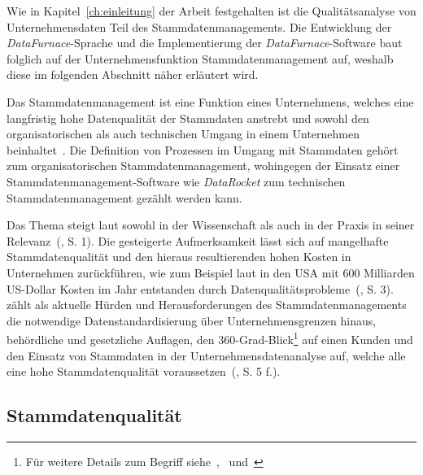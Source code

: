 \documentclass[
  language=german, %
  type=bachelor,%
  ngerman
]{isthesis}
\begin{document}
\begin{content}
  Wie in Kapitel~\ref{ch:einleitung} der Arbeit festgehalten ist die
  Qualitätsanalyse von Unternehmensdaten Teil des Stammdatenmanagements. Die
  Entwicklung der \textit{DataFurnace}-Sprache und die Implementierung der
  \textit{DataFurnace}-Software baut folglich auf der Unternehmensfunktion
  Stammdatenmanagement auf, weshalb diese im folgenden Abschnitt näher
  erläutert wird.

	Das Stammdatenmanagement ist eine Funktion eines Unternehmens, welches eine
	langfristig hohe Datenqualität der Stammdaten anstrebt und sowohl den
	organisatorischen als auch technischen Umgang in einem Unternehmen
	beinhaltet~\cite[][S.  2]{legner2007stammdaten}.  Die Definition von
	Prozessen im Umgang mit Stammdaten gehört \zB{} zum organisatorischen
	Stammdatenmanagement, wohingegen der Einsatz einer Stammdatenmanagement-Software
	wie \textit{DataRocket} zum technischen Stammdatenmanagement gezählt werden
	kann.  

  Das Thema steigt laut \textsc{\citeauthor{otto2012design}} sowohl in der
  Wissenschaft als auch in der Praxis in seiner
  Relevanz~(\citeyear{otto2012design}, S. 1). Die gesteigerte Aufmerksamkeit
  lässt sich auf mangelhafte Stammdatenqualität und den hieraus resultierenden
  hohen Kosten in Unternehmen zurückführen, wie zum Beispiel laut
  \textsc{\citeauthor{eckerson2002data}} in den USA mit 600 Milliarden
  US-Dollar Kosten im Jahr entstanden durch
  Datenqualitätsprobleme~(\citeyear{eckerson2002data}, S. 3).
  \textsc{\citeauthor{otto2011stammdatenmanagement}} zählt als aktuelle Hürden
  und Herausforderungen des Stammdatenmanagements die notwendige
  Datenstandardisierung über Unternehmensgrenzen hinaus, behördliche und
  gesetzliche Auflagen, den 360-Grad-Blick\footnote{Für weitere Details zum
  Begriff siehe~\cite{kotorov2003customer},~\cite{otto2016datenqualitat}
  und~\cite{otto2016master}} auf einen Kunden und den Einsatz von Stammdaten in
  der Unternehmensdatenanalyse auf, welche alle eine hohe Stammdatenqualität
  voraussetzen~(\citeyear{otto2011stammdatenmanagement}, S. 5 f.).
	

	\subsection{Stammdatenqualität}\label{subsec:stammdatenqualität}
	

\end{content}
\end{document}
